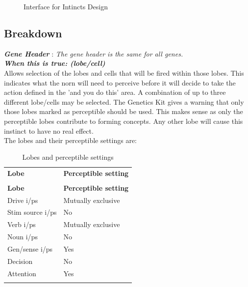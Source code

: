 \documentclass[11pt,twoside,a4paper]{article}
\begin{document}
\begin{figure}[H]
	\centerline {} %
	\caption{Interface for Intincts Design}
	\label{fig:genes_instinct}
\end{figure}

\subsection{Breakdown}

\textbf{\textit{Gene Header}} : \emph{The gene header is the same for all genes.}~\\

\textbf{\textit{When this is true: (lobe/cell)}}~\\

Allows selection of the lobes and cells that will be fired within those lobes. This indicates what the norn will need to perceive before it will decide to take the action defined in the 'and you do this' area. A combination of up to three different lobe/cells may be selected. The Genetics Kit gives a warning that only those lobes marked as perceptible should be used. This makes sense as only the perceptible lobes contribute to forming concepts. Any other lobe will cause this instinct to have no real effect.~\\

The lobes and their perceptible settings are:
\begin{longtable}{|p{}|p{}|}
	\hline \rowcolor[gray]{0.50} \multicolumn{2}{|c|}{Lobes and perceptible settings} \\
	\hline \rowcolor[gray]{0.75} \textbf{Lobe} & \textbf{Perceptible setting} \\ \hline
	\endfirsthead
	\hline \rowcolor[gray]{0.50} \multicolumn{2}{|c|}{Lobes and perceptible settings} \\
	\hline \rowcolor[gray]{0.75} \textbf{Lobe} & \textbf{Perceptible setting} \\ \hline
	\endhead
	\hline 
	\endfoot

		Drive i/ps 		&	Mutually exclusive \\ \hline
		Stim source i/ps 	&	No \\ \hline
		Verb i/ps 		&	Mutually exclusive \\ \hline
		Noun i/ps 		&	No \\ \hline
		Gen/sense i/ps 		&	Yes \\ \hline
		Decision 		&	No \\ \hline
		Attention 		&	Yes \\ \hline

	\hline
	\caption{Lobes and perceptible settings}
	\label{tab:Lobes_and_perceptible_settings}\\
\end{longtable}~\\~\\
\end{document}
